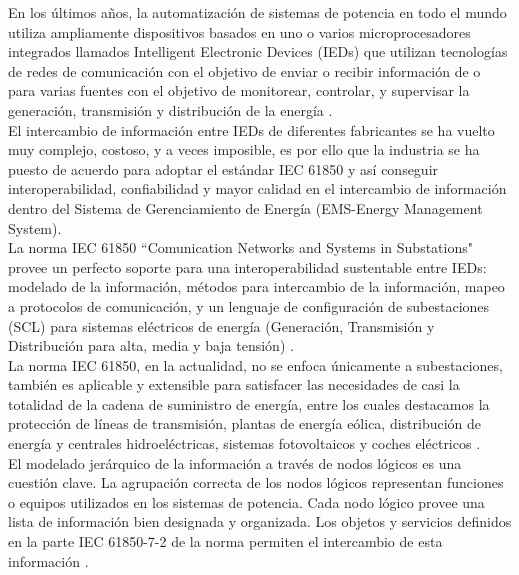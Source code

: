 \documentclass[conference,twocolumn]{IEEEtran}
\begin{document}
En los \'ultimos a\~nos, la automatizaci\'on de sistemas de potencia en todo el mundo utiliza ampliamente dispositivos basados en uno o varios microprocesadores \cite{Santoso2000, Schwarz2000} integrados llamados Intelligent Electronic Devices (IEDs)  que utilizan tecnolog\'ias de redes de comunicaci\'on con el objetivo de enviar o recibir informaci\'on de o para varias fuentes con el objetivo de monitorear, controlar, y supervisar la generaci\'on, transmisi\'on y distribuci\'on de la energ\'ia \cite{McDonald2007, IEEE1997, Schwarz2008}.\\

El intercambio de informaci\'on entre IEDs de diferentes fabricantes se ha vuelto muy complejo, costoso, y a veces imposible, es por ello que la industria se ha puesto de acuerdo para adoptar el est\'andar IEC 61850 y as\'i conseguir interoperabilidad, confiabilidad y mayor calidad en el intercambio de informaci\'on dentro del Sistema de Gerenciamiento de Energ\'ia (EMS-Energy Management System). \\

La norma IEC 61850 ``Comunication Networks and Systems in Substations" provee un perfecto soporte para una interoperabilidad sustentable entre IEDs: modelado de la informaci\'on, m\'etodos para intercambio de la informaci\'on, mapeo a protocolos de comunicaci\'on, y un lenguaje de configuraci\'on de subestaciones (SCL) para sistemas el\'ectricos de energ\'ia (Generaci\'on, Transmisi\'on y Distribuci\'on para alta, media y baja tensi\'on) \cite{Schwarz2008}. \\

La norma IEC 61850, en la actualidad, no se enfoca \'unicamente a subestaciones, tambi\'en es aplicable y extensible para satisfacer las necesidades de casi la totalidad de la cadena de suministro de energ\'ia, entre los cuales destacamos la protecci\'on de l\'ineas de transmisi\'on, plantas de energ\'ia e\'olica, distribuci\'on de energ\'ia y centrales hidroel\'ectricas, sistemas fotovoltaicos y coches el\'ectricos \cite{Schwarz2005, DER2009, German2009}. \\

El modelado jer\'arquico de la informaci\'on a trav\'es de nodos l\'ogicos es una cuesti\'on clave. La agrupaci\'on correcta de los nodos l\'ogicos representan funciones o equipos utilizados en los sistemas de potencia. Cada nodo l\'ogico provee una lista de informaci\'on bien designada y organizada. Los objetos y servicios definidos en la parte IEC 61850-7-2 de la norma permiten el intercambio de esta informaci\'on \cite{TC572004}.\\
\end{document}
